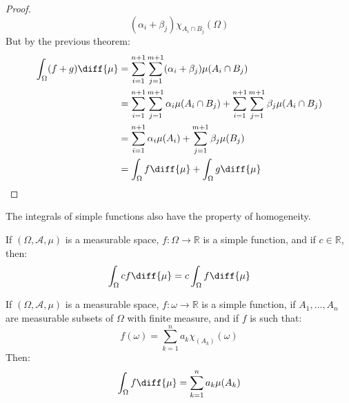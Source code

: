 \begin{proof}
\begin{equation}
                (\alpha_{i}+\beta_{j})\chi_{A_{i}\cap{B}_{j}}(\Omega)
        \end{equation}
        But by the previous theorem:
        \begin{align}
            \int_{\Omega}(f+g)\diff{\mu}
            &=\sum_{i=1}^{n+1}\sum_{j=1}^{m+1}(\alpha_{i}+\beta_{j})
                \mu(A_{i}\cap{B}_{j})\\
            &=\sum_{i=1}^{n+1}\sum_{j=1}^{m+1}\alpha_{i}\mu(A_{i}\cap{B}_{j})+
                \sum_{i=1}^{n+1}\sum_{j=1}^{m+1}\beta_{j}\mu(A_{i}\cap{B}_{j})\\
            &=\sum_{i=1}^{n+1}\alpha_{i}\mu(A_{i})+
                \sum_{j=1}^{m+1}\beta_{j}\mu(B_{j})\\
            &=\int_{\Omega}f\diff{\mu}+\int_{\Omega}g\diff{\mu}
        \end{align}
    \end{proof}
    The integrals of simple functions also have the property of homogeneity.
    \begin{theorem}
        If $(\Omega,\mathcal{A},\mu)$ is a measurable space,
        $f:\Omega\rightarrow\mathbb{R}$ is a simple function, and if
        $c\in\mathbb{R}$, then:
        \begin{equation}
            \int_{\Omega}cf\diff{\mu}=c\int_{\Omega}f\diff{\mu}
        \end{equation}
    \end{theorem}
    \begin{theorem}
        If $(\Omega,\mathcal{A},\mu)$ is a measurable space,
        $f:\omega\rightarrow\mathbb{R}$ is a simple function, if
        $A_{1},\dots,A_{n}$ are measurable subsets of $\Omega$ with
        finite measure, and if $f$ is such that:
        \begin{equation}
            f(\omega)=\sum_{k=1}^{n}a_{k}\chi_(A_{k})(\omega)
        \end{equation}
        Then:
        \begin{equation}
            \int_{\Omega}f\diff{\mu}=\sum_{k=1}^{n}a_{k}\mu(A_{k})
        \end{equation}
    \end{theorem}
